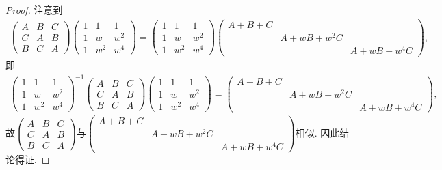 \documentclass[../../main.tex]{subfiles}
\begin{document}
\begin{proof}
注意到
\begin{align*}
\begin{pmatrix}
A & B & C \\
C & A & B \\
B & C & A
\end{pmatrix}
\begin{pmatrix}
1 & 1 & 1 \\
1 & w & w^2 \\
1 & w^2 & w^4
\end{pmatrix}
=
\begin{pmatrix}
1 & 1 & 1 \\
1 & w & w^2 \\
1 & w^2 & w^4
\end{pmatrix}
\begin{pmatrix}
A+B+C & & \\
& A+wB+w^2C & \\
& & A+wB+w^4C
\end{pmatrix},
\end{align*}
即
\begin{align*}
\begin{pmatrix}
1 & 1 & 1 \\
1 & w & w^2 \\
1 & w^2 & w^4
\end{pmatrix}^{-1}
\begin{pmatrix}
A & B & C \\
C & A & B \\
B & C & A
\end{pmatrix}
\begin{pmatrix}
1 & 1 & 1 \\
1 & w & w^2 \\
1 & w^2 & w^4
\end{pmatrix}
=
\begin{pmatrix}
A+B+C & & \\
& A+wB+w^2C & \\
& & A+wB+w^4C
\end{pmatrix},
\end{align*}
故$\begin{pmatrix}
A & B & C \\
C & A & B \\
B & C & A
\end{pmatrix}$与$\begin{pmatrix}
A+B+C & & \\
& A+wB+w^2C & \\
& & A+wB+w^4C
\end{pmatrix}$相似. 因此结论得证.
\end{proof}
\end{document}
